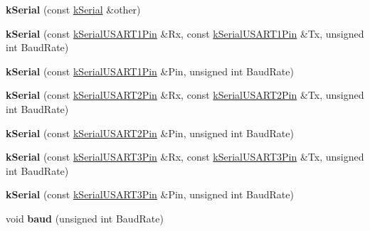 \begin{DoxyCompactItemize}
\item 
{\bfseries k\+Serial} (const \hyperlink{classkSerial}{k\+Serial} \&other)\hypertarget{classkSerial_a502c455e261a0121bf5e2671bec75589}{}\label{classkSerial_a502c455e261a0121bf5e2671bec75589}

\item 
{\bfseries k\+Serial} (const \hyperlink{structkSerialUSART1Pin}{k\+Serial\+U\+S\+A\+R\+T1\+Pin} \&Rx, const \hyperlink{structkSerialUSART1Pin}{k\+Serial\+U\+S\+A\+R\+T1\+Pin} \&Tx, unsigned int Baud\+Rate)\hypertarget{classkSerial_a0d01a0ca232842283d6e74dc1aade899}{}\label{classkSerial_a0d01a0ca232842283d6e74dc1aade899}

\item 
{\bfseries k\+Serial} (const \hyperlink{structkSerialUSART1Pin}{k\+Serial\+U\+S\+A\+R\+T1\+Pin} \&Pin, unsigned int Baud\+Rate)\hypertarget{classkSerial_a5147a9eaac433e07017e382cd2244972}{}\label{classkSerial_a5147a9eaac433e07017e382cd2244972}

\item 
{\bfseries k\+Serial} (const \hyperlink{structkSerialUSART2Pin}{k\+Serial\+U\+S\+A\+R\+T2\+Pin} \&Rx, const \hyperlink{structkSerialUSART2Pin}{k\+Serial\+U\+S\+A\+R\+T2\+Pin} \&Tx, unsigned int Baud\+Rate)\hypertarget{classkSerial_a5ce28ad3c00c5eb60110e0037e3d6025}{}\label{classkSerial_a5ce28ad3c00c5eb60110e0037e3d6025}

\item 
{\bfseries k\+Serial} (const \hyperlink{structkSerialUSART2Pin}{k\+Serial\+U\+S\+A\+R\+T2\+Pin} \&Pin, unsigned int Baud\+Rate)\hypertarget{classkSerial_aff7fb8ae9ba68ef546065f73d7168bae}{}\label{classkSerial_aff7fb8ae9ba68ef546065f73d7168bae}

\item 
{\bfseries k\+Serial} (const \hyperlink{structkSerialUSART3Pin}{k\+Serial\+U\+S\+A\+R\+T3\+Pin} \&Rx, const \hyperlink{structkSerialUSART3Pin}{k\+Serial\+U\+S\+A\+R\+T3\+Pin} \&Tx, unsigned int Baud\+Rate)\hypertarget{classkSerial_a95e6c354954a3af6184fc6b529692a49}{}\label{classkSerial_a95e6c354954a3af6184fc6b529692a49}

\item 
{\bfseries k\+Serial} (const \hyperlink{structkSerialUSART3Pin}{k\+Serial\+U\+S\+A\+R\+T3\+Pin} \&Pin, unsigned int Baud\+Rate)\hypertarget{classkSerial_a9c1890327469e541139a621107576cd1}{}\label{classkSerial_a9c1890327469e541139a621107576cd1}

\item 
void {\bfseries baud} (unsigned int Baud\+Rate)\hypertarget{classkSerial_a18f6c2307a8a213ebb1ab2ff31657271}{}\label{classkSerial_a18f6c2307a8a213ebb1ab2ff31657271}


\end{DoxyCompactItemize}
